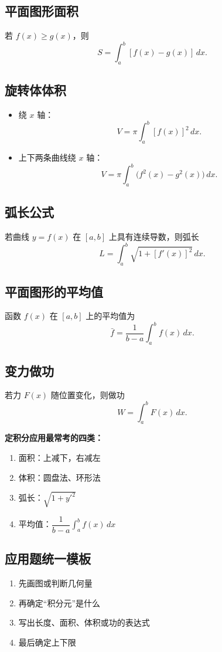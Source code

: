 \documentclass[12pt,a4paper]{ctexart}
\begin{document}
\subsection{平面图形面积}
若 $f(x)\ge g(x)$，则
\[
S=\int_a^b [f(x)-g(x)]\,dx.
\]

\subsection{旋转体体积}
\begin{itemize}
  \item 绕 $x$ 轴：
  \[
  V=\pi\int_a^b [f(x)]^2\,dx.
  \]
  \item 上下两条曲线绕 $x$ 轴：
  \[
  V=\pi\int_a^b \big(f^2(x)-g^2(x)\big)\,dx.
  \]
\end{itemize}

\subsection{弧长公式}
若曲线 $y=f(x)$ 在 $[a,b]$ 上具有连续导数，则弧长
\[
L=\int_a^b \sqrt{1+[f'(x)]^2}\,dx.
\]

\subsection{平面图形的平均值}
函数 $f(x)$ 在 $[a,b]$ 上的平均值为
\[
\bar f=\frac1{b-a}\int_a^b f(x)\,dx.
\]

\subsection{变力做功}
若力 $F(x)$ 随位置变化，则做功
\[
W=\int_a^b F(x)\,dx.
\]

\begin{keybox}
\textbf{定积分应用最常考的四类：}
\begin{enumerate}
  \item 面积：上减下，右减左
  \item 体积：圆盘法、环形法
  \item 弧长：$\sqrt{1+y'^2}$
  \item 平均值：$\dfrac1{b-a}\int_a^b f(x)\,dx$
\end{enumerate}
\end{keybox}

\subsection{应用题统一模板}
\begin{enumerate}
  \item 先画图或判断几何量
  \item 再确定“积分元”是什么
  \item 写出长度、面积、体积或功的表达式
  \item 最后确定上下限
\end{enumerate}
\end{document}
